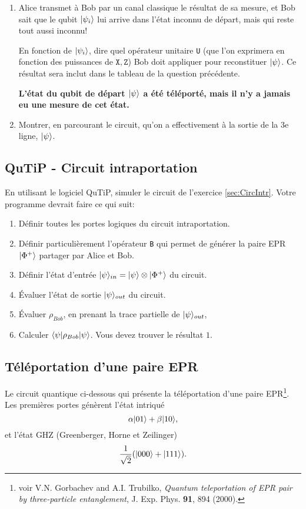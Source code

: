 \begin{enumerate}
\item Alice transmet à Bob par un canal classique le résultat de sa mesure, et
Bob sait que le qubit $\vert\psi_{i}\rangle$ lui arrive dans l'état inconnu de départ,
mais qui reste tout aussi inconnu!

En fonction de $\vert\psi_{i}\rangle$, dire quel opérateur unitaire \texttt{U} (que
l'on exprimera en fonction des puissances de $\mathtt{X},\mathtt{Z}$) Bob doit
appliquer pour reconstituer $\vert\psi\rangle$. Ce résultat sera inclut dans le
tableau de la question précédente.

\textbf{ L'état du qubit de départ $\vert\psi\rangle$ a été téléporté, mais il n'y a
jamais eu une mesure de cet état.}

\item Montrer, en parcourant le circuit, qu'on a effectivement à la sortie de
la 3e ligne, $\vert\psi\rangle$.

\end{enumerate}

\subsection{QuTiP - Circuit intraportation}
En utilisant le logiciel QuTiP, simuler le circuit de l'exercice 
\ref{sec:CircIntr}. Votre programme devrait faire ce qui suit:

\begin{enumerate}
\item Définir toutes les portes logiques du circuit intraportation.
\item Définir particulièrement l'opérateur \texttt{B} qui permet de générer 
la paire EPR $\vert\Phi^{+}\rangle$ partager par Alice et Bob.
\item Définir l'état d'entrée $\vert\psi\rangle_{in}=\vert\psi\rangle\otimes\vert\Phi^{+}\rangle$ 
du circuit.
\item Évaluer l'état de sortie $\vert\psi\rangle_{out}$ du circuit.
\item Évaluer $\rho_{Bob}$, en prenant la trace partielle de $\vert\psi\rangle_{out}$,
\item Calculer $\langle\psi\vert\rho_{Bob}\vert\psi\rangle$. Vous devez trouver le résultat $1$.
\end{enumerate}


\subsection{Téléportation d'une paire EPR}\label{CircuiEPR}

Le circuit quantique ci-dessous qui présente la téléportation d'une paire 
EPR\footnote{voir V.N. Gorbachev and A.I. Trubilko, \emph{Quantum teleportation 
of EPR pair by three-particle entanglement}, J. Exp. Phys. \textbf{91}, 894 
(2000).}. Les premières portes génèrent l'état intriqué%
\begin{equation}
\alpha\ket{01} +\beta\ket{10} ,
\label{eq:EPRTelep}%
\end{equation}
et l'état GHZ (Greenberger, Horne et Zeilinger)%
\begin{equation}
\frac{1}{\sqrt{2}}(\vert000\rangle+\vert111\rangle).
\end{equation}

